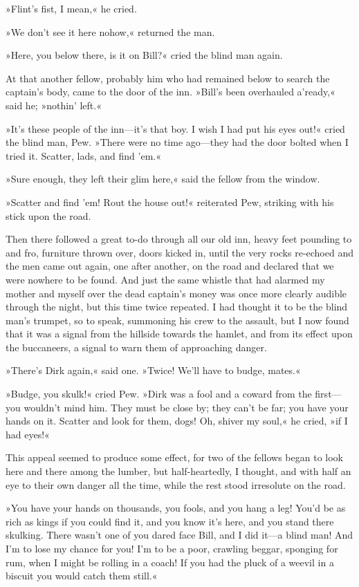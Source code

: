 »Flint's fist, I mean,« he cried.

»We don't see it here nohow,« returned the man.

»Here, you below there, is it on Bill?« cried the blind man again.

At that another fellow, probably him who had remained below to search the captain's body, came to the door of the inn. »Bill's been overhauled a'ready,« said he; »nothin' left.«

»It's these people of the inn—it's that boy. I wish I had put his eyes out!« cried the blind man, Pew. »There were no time ago—they had the door bolted when I tried it. Scatter, lads, and find 'em.«

»Sure enough, they left their glim here,« said the fellow from the window.

»Scatter and find 'em! Rout the house out!« reiterated Pew, striking with his stick upon the road.

Then there followed a great to-do through all our old inn, heavy feet pounding to and fro, furniture thrown over, doors kicked in, until the very rocks re-echoed and the men came out again, one after another, on the road and declared that we were nowhere to be found. And just the same whistle that had alarmed my mother and myself over the dead captain's money was once more clearly audible through the night, but this time twice repeated. I had thought it to be the blind man's trumpet, so to speak, summoning his crew to the assault, but I now found that it was a signal from the hillside towards the hamlet, and from its effect upon the buccaneers, a signal to warn them of approaching danger.

»There's Dirk again,« said one. »Twice! We'll have to budge, mates.«

»Budge, you skulk!« cried Pew. »Dirk was a fool and a coward from the first—you wouldn't mind him. They must be close by; they can't be far; you have your hands on it. Scatter and look for them, dogs! Oh, shiver my soul,« he cried, »if I had eyes!«

This appeal seemed to produce some effect, for two of the fellows began to look here and there among the lumber, but half-heartedly, I thought, and with half an eye to their own danger all the time, while the rest stood irresolute on the road.

»You have your hands on thousands, you fools, and you hang a leg! You'd be as rich as kings if you could find it, and you know it's here, and you stand there skulking. There wasn't one of you dared face Bill, and I did it—a blind man! And I'm to lose my chance for you! I'm to be a poor, crawling beggar, sponging for rum, when I might be rolling in a coach! If you had the pluck of a weevil in a biscuit you would catch them still.«

